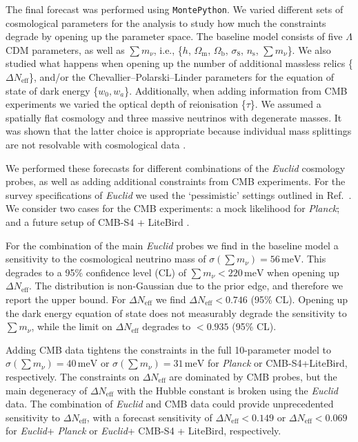\documentclass[a4paper,11pt]{article}
\newcommand{\euclid}{\textit{Euclid}\xspace}
\newcommand{\planck}{\textit{Planck}\xspace}
\newcommand{\dneff}{\Delta N_\mathrm{eff}}
\newcommand{\summnu}{\sum m_\nu}
\newcommand{\montepython}{\texttt{MontePython}\xspace}
\begin{document}
The final forecast was performed using \montepython. We varied different sets of cosmological parameters for the analysis to study how much the constraints degrade by opening up the parameter space. The baseline model consists of five $\Lambda$CDM parameters, as well as $\summnu$, i.e., \{$h$, $\Omega_\mathrm{m}$, $\Omega_\mathrm{b}$, $\sigma_8$, $n_\mathrm{s}$, $\summnu$\}. We also studied what happens when opening up the number of additional massless relics \{$\dneff$\}, and/or the Chevallier--Polarski--Linder parameters for the equation of state of dark energy \{$w_0,w_a$\}. Additionally, when adding information from CMB experiments we varied the optical depth of reionisation \{$\tau$\}. We assumed a spatially flat cosmology and three massive neutrinos with degenerate masses. It was shown that the latter choice is appropriate because individual mass splittings are not resolvable with cosmological data \cite{Lesgourgues:2013sjj}.

We performed these forecasts for different combinations of the \euclid cosmology probes, as well as adding additional constraints from CMB experiments. For the survey specifications of \euclid we used the `pessimistic' settings outlined in Ref.~\cite{Blanchard-EP7}. We consider two cases for the CMB experiments: a mock likelihood for \planck \cite{Planck:2018vyg}; and a future setup of CMB-S4 \cite{CMBS4} + LiteBird \cite{LiteBIRD}.

For the combination of the main \euclid probes we find in the baseline model a sensitivity to the cosmological neutrino mass of $\sigma\left(\summnu\right)=56\,\mathrm{meV}$. This degrades to a 95\% confidence level (CL) of $\summnu<220\,\mathrm{meV}$ when opening up $\dneff$. The distribution is non-Gaussian due to the prior edge, and therefore we report the upper bound. For $\dneff$ we find $\dneff<0.746$ (95\% CL). Opening up the dark energy equation of state does not measurably degrade the sensitivity to $\summnu$, while the limit on $\dneff$ degrades to $<0.935$ (95\% CL).

Adding CMB data tightens the constraints in the full 10-parameter model to \mbox{$\sigma\left(\summnu\right)=40\,\mathrm{meV}$} or $\sigma\left(\summnu\right)=31\,\mathrm{meV}$ for \planck or CMB-S4+LiteBird, respectively. The constraints on $\dneff$ are dominated by CMB probes, but the main degeneracy of $\dneff$ with the Hubble constant is broken using the \euclid data. The combination of \euclid and CMB data could provide unprecedented sensitivity to $\dneff$, with a forecast sensitivity of $\dneff<0.149$ or $\dneff<0.069$ for \euclid + \planck or \euclid + CMB-S4 + LiteBird, respectively.
\end{document}
